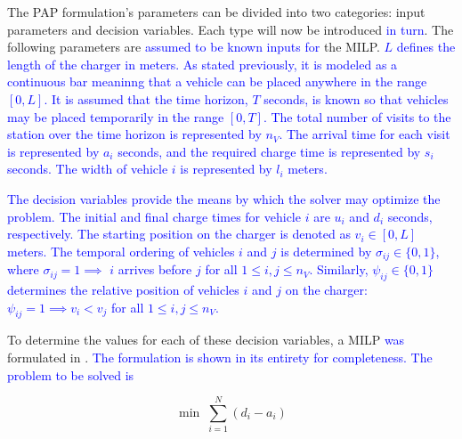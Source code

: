 \documentclass[utf8]{FrontiersinHarvard}
\let\cite\citep                                       %
\begin{document}
The PAP formulation's parameters can be divided into two categories: input parameters and decision variables. Each type
will now be introduced \textcolor{blue}{in turn}. The following parameters are
\textcolor{blue}{assumed to be known inputs for} the MILP. \textcolor{blue}{$L$ defines the length of the charger in meters. As stated previously, it is modeled as a continuous bar meaninng that a vehicle can be placed anywhere in the range $[0,L]$. It is assumed that the time horizon, $T$ seconds, is known so that vehicles may be placed temporarily in the range $[0,T]$. The total number of visits to the station over the time horizon is represented by $n_V$. The arrival time for each visit is represented by $a_i$ seconds, and the required charge time is represented by $s_i$ seconds. The width of vehicle $i$ is represented by $l_i$ meters.}

\textcolor{blue}{The decision variables provide the means by which the solver may optimize the problem. The initial and final charge times for vehicle $i$ are $u_i$ and $d_i$ seconds, respectively. The starting position on the charger is denoted as $v_i \in [0,L]$ meters. The temporal ordering of vehicles $i$ and $j$ is determined by $\sigma_{ij} \in \{0, 1\}$, where $\sigma_{ij} = 1 \implies$ $i$ arrives before $j$ for all $1 \le i,j \le n_V$. Similarly, $\psi_{ij} \in \{0, 1\}$ determines the relative position of vehicles $i$ and $j$ on the charger: $\psi_{ij} = 1 \implies v_i < v_j$ for all $1 \le i,j \le n_V$.}

To determine the values for each of these decision variables, a MILP \textcolor{blue}{was} formulated in
\cite{qarebagh-2019-optim-sched}. \textcolor{blue}{The formulation is shown in its entirety for completeness. The problem to be solved is}

\begin{equation}
	\label{eq:bapobjective}
	\min\; \sum_{i=1}^N (d_i - a_i)
\end{equation}
\end{document}
